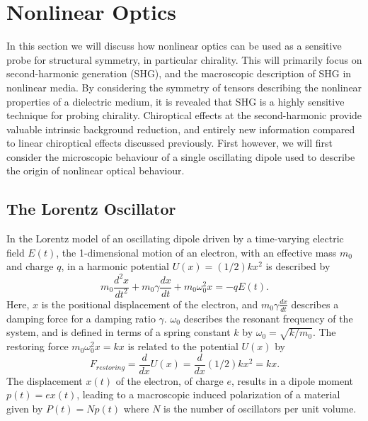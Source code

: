 \chapter{Nonlinear Optics}\label{sec:background:NonlinearOptics}

In this section we will discuss how nonlinear optics can be used as a sensitive probe for structural symmetry, in particular chirality. This will primarily focus on second-harmonic generation (SHG), and the macroscopic description of SHG in nonlinear media. By considering the symmetry of tensors describing the nonlinear properties of a dielectric medium, it is revealed that SHG is a highly sensitive technique for probing chirality. Chiroptical effects at the second-harmonic provide valuable intrinsic background reduction, and entirely new information compared to linear chiroptical effects discussed previously. First however, we will first consider the microscopic behaviour of a single oscillating dipole used to describe the origin of nonlinear optical behaviour.

\section{The Lorentz Oscillator}\label{sec:background:NonlinearOptics:lorentz}
In the Lorentz model of an oscillating dipole driven by a time-varying electric field $E(t)$, the 1-dimensional motion of an electron, with an effective mass $m_0$ and charge $q$, in a harmonic potential $U(x) = (1/2)kx^{2}$ is described by
\begin{equation}\label{eq:NonlinearOptics:eqMotion}
	m_{0} \frac{d^2 x}{dt^2} + m_{0} \gamma \frac{dx}{dt} + m_{0} \omega_{0}^2 x = -q E(t).
\end{equation}
Here, $x$ is the positional displacement of the electron, and $m_{0} \gamma \frac{dx}{dt}$ describes a damping force for a damping ratio $\gamma$. $\omega_{0}$ describes the resonant frequency of the system, and is defined in terms of a spring constant $k$ by $\omega_{0} = \sqrt{k/m_{0}}$. The restoring force $m_{0} \omega_{0}^2 x = kx$ is related to the potential $U(x)$ by
\begin{equation}
	F_{restoring} = \frac{d}{dx} U(x) = \frac{d}{dx} (1/2)kx^{2} = kx.
\end{equation}
The displacement $x(t)$ of the electron, of charge $e$,  results in a dipole moment $p(t) = ex(t)$, leading to a macroscopic induced polarization of a material given by $P(t) = Np(t)$ where $N$ is the number of oscillators per unit volume.

